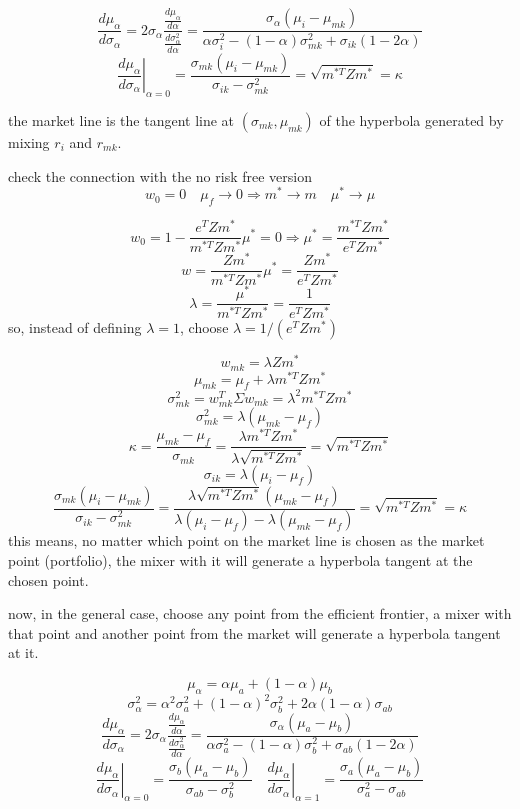 \documentclass[10pt,a4paper]{article}
\begin{document}
\[
\frac{d\mu_\alpha}{d\sigma_\alpha} = 2\sigma_\alpha \frac{\frac{d\mu_\alpha}{d\alpha}}{\frac{d\sigma^2_\alpha}{d\alpha}}
=\frac{\sigma_\alpha(\mu_i-\mu_{mk})}{\alpha\sigma^2_i -(1-\alpha)\sigma_{mk}^2 + \sigma_{ik}(1-2\alpha)}
\]
\[
\left. \frac{d\mu_\alpha}{d\sigma_\alpha} \right|_{\alpha = 0} = \frac{\sigma_{mk}(\mu_i-\mu_{mk})}{ \sigma_{ik}-\sigma_{mk}^2 } = \sqrt{m^{*T}Zm^*} = \kappa
\]

the market line is the tangent line at $(\sigma_{mk}, \mu_{mk})$ of the hyperbola generated by mixing $r_i$ and $r_{mk}$.


check the connection with the no risk free version
\[
w_0 = 0 \quad \mu_f \rightarrow 0 \Rightarrow m^* \rightarrow m \quad \mu^* \rightarrow \mu
\]

\[
w_0 = 1- \frac{e^TZm^*}{m^{*T} Z m^*}\mu^* = 0 \Rightarrow \mu^* = \frac{m^{*T}Zm^*}{e^TZm^*}
\]
\[
w = \frac{Zm^*}{m^{*T}Zm^*}\mu^* = \frac{Zm^*}{e^TZm^*}
\]
\[
\lambda = \frac{\mu^*}{m^{*T}Zm^*} = \frac{1}{e^TZm^*}
\]
so, instead of defining $\lambda = 1$, choose $\lambda = 1/(e^TZm^*)$

\[
w_{mk}= \lambda Z m^*
\]
\[
\mu_{mk} = \mu_f +\lambda m^{*T} Z m^*
\]
\[
\sigma^2_{mk} = w_{mk}^T\Sigma w_{mk} = \lambda^2 m^{*T}Zm^*
\]
\[
\sigma^2_{mk} = \lambda( \mu_{mk} - \mu_f)
\]
\[
\kappa = \frac{\mu_{mk} - \mu_f}{\sigma_{mk}} = \frac{\lambda m^{*T} Z m^*}{\lambda \sqrt{m^{*T}Zm^*}} = \sqrt{m^{*T}Zm^*}
\]
\[
\sigma_{ik} = \lambda(\mu_i - \mu_f)
\]
\[
\frac{\sigma_{mk}(\mu_i-\mu_{mk})}{ \sigma_{ik}-\sigma_{mk}^2 }  = \frac{\lambda \sqrt{m^{*T}Zm^*}(\mu_{mk}-\mu_f)}{\lambda(\mu_i - \mu_f) - \lambda(\mu_{mk}-\mu_f)} = \sqrt{m^{*T}Zm^*} = \kappa
\]
this means, no matter which point on the market line is chosen as the market point (portfolio), the mixer with it will generate a hyperbola tangent at the chosen point.

now, in the general case, choose any point from the efficient frontier, a mixer with that point and another point from the market will generate a hyperbola tangent at it.

\[
\mu_\alpha = \alpha \mu_a + (1- \alpha) \mu_b
\]
\[
\sigma^2_{\alpha} = \alpha^2 \sigma^2_{a} + (1-\alpha)^2 \sigma^2_{b} + 2\alpha(1-\alpha)\sigma_{ab}
\]
\[
\frac{d\mu_\alpha}{d\sigma_\alpha} = 2\sigma_\alpha \frac{\frac{d\mu_\alpha}{d\alpha}}{\frac{d\sigma^2_\alpha}{d\alpha}}
=\frac{\sigma_\alpha(\mu_a-\mu_{b})}{\alpha\sigma^2_a -(1-\alpha)\sigma_{b}^2 + \sigma_{ab}(1-2\alpha)}
\]
\[
\left.\frac{d\mu_\alpha}{d\sigma_\alpha}\right|_{\alpha = 0} = \frac{\sigma_b(\mu_a-\mu_{b})}{\sigma_{ab} -\sigma_{b}^2 } \quad
\left.\frac{d\mu_\alpha}{d\sigma_\alpha}\right|_{\alpha = 1} = \frac{\sigma_a(\mu_a-\mu_{b})}{\sigma_{a}^2 - \sigma_{ab}} 
\]
\end{document}
